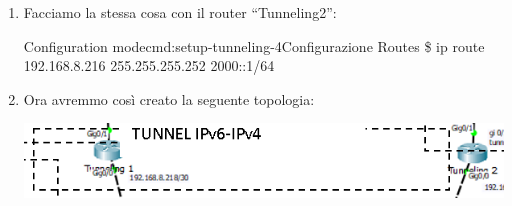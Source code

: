 \begin{enumerate}
    \begin{cmds}{Configuration mode}{cmd:setup-tunneling-4}{Configurazione Routes}
        \$ ip route 192.168.8.212 255.255.255.252 2000::2/64
    \end{cmds}
    \item Facciamo la stessa cosa con il router “Tunneling2”:\par
    \begin{cmds}{Configuration mode}{cmd:setup-tunneling-4}{Configurazione Routes}
        \$ ip route 192.168.8.216 255.255.255.252 2000::1/64
    \end{cmds}
    \item Ora avremmo così creato la seguente topologia:\par
    \begin{center}
        \includegraphics[width=\linewidth]{images/07.routing-sicurezza/tunneling/11.png}
    \end{center}
\end{enumerate}

